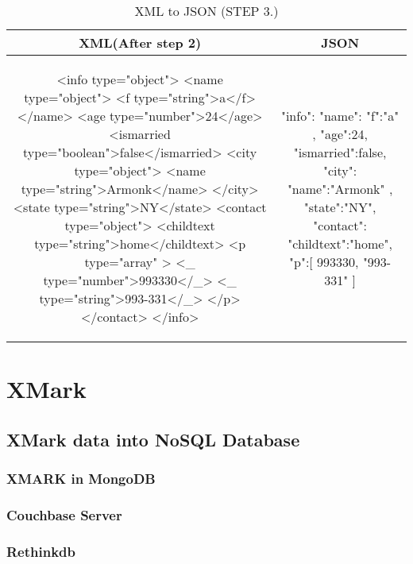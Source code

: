 	\begin{longtable}{c|c}
	\caption{XML to JSON (STEP 3.)}
	\label{tbl:xmljson-convert-3}\\
	\textbf{XML(After step 2)} & \textbf{JSON}\\
	\hline
\begin{minipage}{.55\textwidth}
\begin{fakeXML}
<info type="object">
  <name type="object">
    <f type="string">a</f>
  </name>
  <age type="number">24</age>
  <ismarried type="boolean">false</ismarried>
  <city type="object">
    <name type="string">Armonk</name>
  </city>
  <state type="string">NY</state>
  <contact type="object">
	<childtext type="string">home</childtext>
    <p  type="array" >
	   <_ type="number">993330</_>
	   <_ type="string">993-331</_>
    </p>
  </contact>
</info>
\end{fakeXML}	
\end{minipage} &
\begin{minipage}{.5\textwidth}
\begin{fakeJSON}
{
    "info":{
      "name":{
        "f":"a"
      },
      "age":24,
      "ismarried":false,
      "city":{
        "name":"Armonk"
      },
      "state":"NY",
      "contact":{
	   "childtext":"home",
        "p":[
          993330,
          "993-331"
        ]
      }
    }
}
\end{fakeJSON}
\end{minipage}\\
\end{longtable}
	
\section{XMark}\label{xmark}
			
		\subsection{XMark data into NoSQL Database}\label{xmark-nosql}
			
			\subsubsection{XMARK in MongoDB}\label{xmark-mongodb}
				
			\subsubsection{Couchbase Server}\label{xmark-couchbase}
				
			\subsubsection{Rethinkdb}\label{xmark-rethinkdb}
				